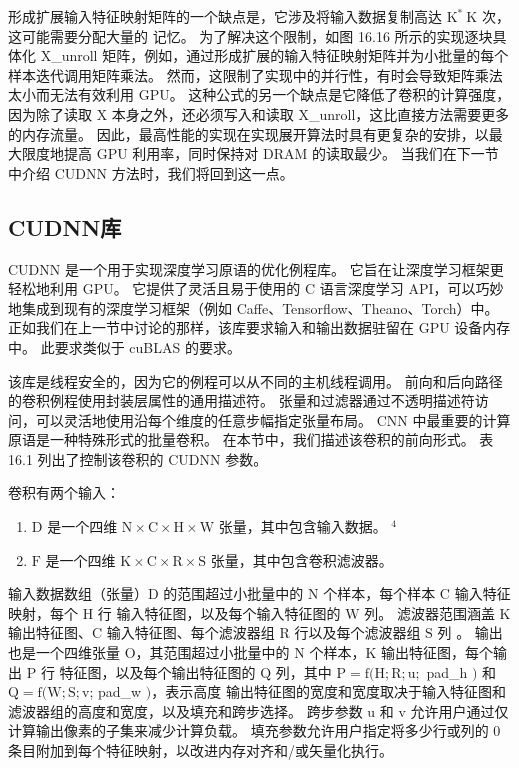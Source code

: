 形成扩展输入特征映射矩阵的一个缺点是，它涉及将输入数据复制高达 $\mathrm{K}^{*} \mathrm{~K}$ 次，这可能需要分配大量的 记忆。 为了解决这个限制，如图 16.16 所示的实现逐块具体化 X\_unroll 矩阵，例如，通过形成扩展的输入特征映射矩阵并为小批量的每个样本迭代调用矩阵乘法。 然而，这限制了实现中的并行性，有时会导致矩阵乘法太小而无法有效利用 GPU。 这种公式的另一个缺点是它降低了卷积的计算强度，因为除了读取 $\mathrm{X}$ 本身之外，还必须写入和读取 X\_unroll，这比直接方法需要更多的内存流量。 因此，最高性能的实现在实现展开算法时具有更复杂的安排，以最大限度地提高 GPU 利用率，同时保持对 DRAM 的读取最少。 当我们在下一节中介绍 CUDNN 方法时，我们将回到这一点。

\subsection{CUDNN库}
CUDNN 是一个用于实现深度学习原语的优化例程库。 它旨在让深度学习框架更轻松地利用 GPU。 它提供了灵活且易于使用的 C 语言深度学习 API，可以巧妙地集成到现有的深度学习框架（例如 Caffe、Tensorflow、Theano、Torch）中。 正如我们在上一节中讨论的那样，该库要求输入和输出数据驻留在 GPU 设备内存中。 此要求类似于 cuBLAS 的要求。

该库是线程安全的，因为它的例程可以从不同的主机线程调用。 前向和后向路径的卷积例程使用封装层属性的通用描述符。 张量和过滤器通过不透明描述符访问，可以灵活地使用沿每个维度的任意步幅指定张量布局。 $\mathrm{CNN}$ 中最重要的计算原语是一种特殊形式的批量卷积。 在本节中，我们描述该卷积的前向形式。 表 16.1 列出了控制该卷积的 CUDNN 参数。

卷积有两个输入：

\begin{enumerate}
   \item $\mathrm{D}$ 是一个四维 $\mathrm{N} \times \mathrm{C} \times \mathrm{H} \times \mathrm{W}$ 张量，其中包含输入数据。 ${ }^{4}$

   \item $\mathrm{F}$ 是一个四维 $\mathrm{K} \times \mathrm{C} \times \mathrm{R} \times \mathrm{S}$ 张量，其中包含卷积滤波器。
\end{enumerate}

输入数据数组（张量）$\mathrm{D}$ 的范围超过小批量中的 $\mathrm{N}$ 个样本，每个样本 $\mathrm{C}$ 输入特征映射，每个 $\mathrm{H}$ 行 输入特征图，以及每个输入特征图的 $\mathrm{W}$ 列。 滤波器范围涵盖 $\mathrm{K}$ 输出特征图、$\mathrm{C}$ 输入特征图、每个滤波器组 $\mathrm{R}$ 行以及每个滤波器组 $\mathrm{S}$ 列 。 输出也是一个四维张量 $\mathrm{O}$，其范围超过小批量中的 $\mathrm{N}$ 个样本，$\mathrm{K}$ 输出特征图，每个输出 $\mathrm{P}$ 行 特征图，以及每个输出特征图的 $\mathrm{Q}$ 列，其中 $\mathrm{P}=\mathrm{f}(\mathrm{H} ; \mathrm{R} ; \mathrm{u} ;$ pad\_h $)$ 和 $\mathrm{Q}=\mathrm{f}(\mathrm{W} ; \mathrm{S} ; \mathrm{v}$; pad\_w $)$，表示高度 输出特征图的宽度和宽度取决于输入特征图和滤波器组的高度和宽度，以及填充和跨步选择。 跨步参数 $\mathrm{u}$ 和 $\mathrm{v}$ 允许用户通过仅计算输出像素的子集来减少计算负载。 填充参数允许用户指定将多少行或列的 0 条目附加到每个特征映射，以改进内存对齐和/或矢量化执行。

